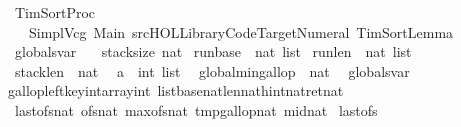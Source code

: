 %
\begin{isabellebody}%
%
%
\isadelimtheory
%
\endisadelimtheory
%
\isatagtheory
{}\isamarkupfalse%
\ TimSortProc\isanewline
\ \ \ {\isachardoublequoteopen}{\isachardot}{\isachardot}{\isacharslash}Simpl{\isacharslash}Vcg{\isachardoublequoteclose}\ Main\ {\isachardoublequoteopen}{\isachartilde}{\isachartilde}{\isacharslash}src{\isacharslash}HOL{\isacharslash}Library{\isacharslash}Code{\isacharunderscore}Target{\isacharunderscore}Numeral{\isachardoublequoteclose}\ {\isachardoublequoteopen}TimSortLemma{\isachardoublequoteclose}\isanewline
{}%
\endisatagtheory
{\isafoldtheory}%
%
\isadelimtheory
\ \isanewline
%
\endisadelimtheory
\isanewline
{}\isamarkupfalse%
\ globals{\isacharunderscore}var\ {\isacharequal}\ \isanewline
\ stack{\isacharunderscore}size{\isacharcolon}{\isacharcolon}\ nat\isanewline
\ run{\isacharunderscore}base\ {\isacharcolon}{\isacharcolon}\ {\isachardoublequoteopen}nat\ list{\isachardoublequoteclose}\isanewline
\ run{\isacharunderscore}len\ {\isacharcolon}{\isacharcolon}\ {\isachardoublequoteopen}nat\ list{\isachardoublequoteclose}\isanewline
\ stack{\isacharunderscore}len\ {\isacharcolon}{\isacharcolon}\ nat\ \isanewline
\ a\ {\isacharcolon}{\isacharcolon}\ {\isachardoublequoteopen}int\ list{\isachardoublequoteclose}\ \isanewline
\ global{\isacharunderscore}min{\isacharunderscore}gallop\ {\isacharcolon}{\isacharcolon}\ nat\isanewline
\isanewline
\isanewline
{}\isamarkupfalse%
\ {\isacharparenleft}\ globals{\isacharunderscore}var{\isacharparenright}\isanewline
gallop{\isacharunderscore}left{\isacharparenleft}key{\isacharcolon}{\isacharcolon}int{\isacharcomma}array{\isacharcolon}{\isacharcolon}{\isachardoublequoteopen}int\ list{\isachardoublequoteclose}{\isacharcomma}base{\isacharcolon}{\isacharcolon}nat{\isacharcomma}len{\isacharcolon}{\isacharcolon}nat{\isacharcomma}hint{\isacharcolon}{\isacharcolon}nat{\isacharbar}ret{\isacharcolon}{\isacharcolon}nat{\isacharparenright}\isanewline
{}\ last{\isacharunderscore}ofs{\isacharcolon}{\isacharcolon}nat\ ofs{\isacharcolon}{\isacharcolon}nat\ max{\isacharunderscore}ofs{\isacharcolon}{\isacharcolon}nat\ tmp{\isacharunderscore}gallop{\isacharcolon}{\isacharcolon}nat\ mid{\isacharcolon}{\isacharcolon}nat\ \isanewline
{\isachardoublequoteopen}\isanewline
{\isasymacute}last{\isacharunderscore}ofs{\isacharcolon}{\isacharequal}{\isacharequal}{}{\isacharsemicolon}{\isacharsemicolon}\isanewline

\end{isabellebody}
